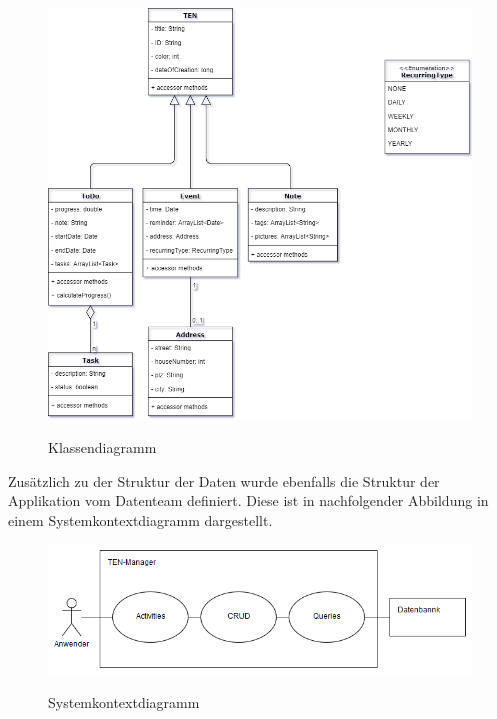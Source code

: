 \begin{figure}[H]
\centering
\begin{minipage}[t]{1\textwidth} %
\caption{Klassendiagramm} %
\includegraphics[width=1\textwidth]{img/Klassendiagramm}\\ %
\end{minipage}
\end{figure}

Zusätzlich zu der Struktur der Daten wurde ebenfalls die Struktur der Applikation vom Datenteam definiert. Diese ist in nachfolgender Abbildung in einem Systemkontextdiagramm dargestellt.

\begin{figure}[H]
\centering
\begin{minipage}[t]{1\textwidth} %
\caption{Systemkontextdiagramm} %
\includegraphics[width=1\textwidth]{img/Systemkontextdiagramm}\\ %
\end{minipage}
\end{figure}

